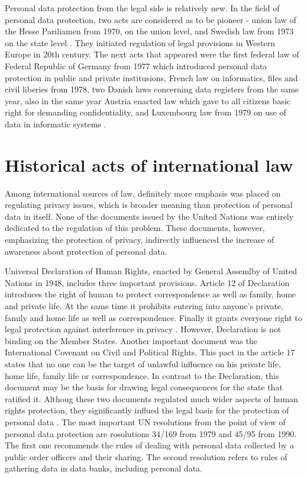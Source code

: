\documentclass[en, noamssymb]{mgr}
\begin{document}
\indent Personal data protection from the legal side is relatively new. In the field of personal data protection, two acts are considered as to be pioneer - union law of the Hesse Pariliamen from 1970, on the union level, and Swedish law from 1973 on the state level \cite{prawo_odo}. They initiated regulation of legal provisions in Western Europe 
in 20th century. The next acts that appeared were the first federal law of Federal Republic of Germany from 1977  which introduced personal data protection in public and private institusions, French law on informatics, files and civil liberies from 1978, two Danish laws concerning data registers from the same year, also in the same year Austria enacted law which gave to all citizens basic right for demanding confidentiality, and Luxembourg law from 1979 on use of data in informatic systems \cite{prawo_odo}.



\section{Historical acts of international law}

\indent Among international sources of law, definitely more emphasis was placed on regulating privacy issues, which is broader meaning than protection of personal data in itself. None of the documents issued by the United Nations was entirely dedicated to the regulation of this problem. These documents, however, emphasizing the protection of privacy, indirectly influenced the increase of awareness about protection of personal data.

\indent Universal Declaration of Human Rights, enacted by General Assemlby of United Nations in 1948, includes three important provisions. Article 12 of Declaration introduces the right of human to protect correspondence as well as family, home and private life. At the same time it prohibits entering into anyone's private, family and home life as well as correspondence. Finally it grants everyone right to legal protection against interference in privacy \cite{prawo_odo}. However, Declaration is not binding on the Member States. Another important document was the International Covenant on Civil and Political Rights. This pact in the article 17 states that no one can be the target of unlawful influence on his private life, home life, family life or correspondence. In contrast to the Declaration, this document may be the basis for drawing legal consequences for the state that ratified it. Althoug these two documents regulated much wider aspects of human rights protection, they significantly influed the legal basis for the protection of personal data \cite{prawo_odo}. The most important UN resolutions from the point of view of personal data protection are rosolutions 34/169 from 1979 and 45/95 from 1990. The first one recommends the rules of dealing with personal data collected by a public order officers and their sharing. The second resolution refers to rules of gathering data in data banks, including personal data.
\end{document}
